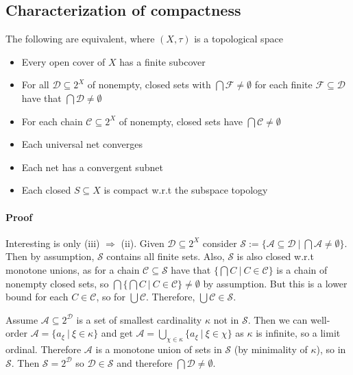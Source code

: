 \documentclass{scrartcl}
\begin{document}
\subsection{Characterization of compactness}
The following are equivalent, where $(X, \tau)$ is a topological space
\begin{itemize}
    \item Every open cover of $X$ has a finite subcover
    \item For all $\mathcal{D} \subseteq 2^X$ of nonempty, closed sets with $\bigcap \mathcal{F} \neq \emptyset$ for each finite $\mathcal{F} \subseteq \mathcal{D}$ have that $\bigcap \mathcal{D} \neq \emptyset$
    \item For each chain $\mathcal{C} \subseteq 2^X$ of nonempty, closed sets have $\bigcap \mathcal{C} \neq \emptyset$
    \item Each universal net converges
    \item Each net has a convergent subnet
    \item Each closed $S \subseteq X$ is compact w.r.t the subspace topology
\end{itemize}
\paragraph{Proof} Interesting is only (iii) $\Rightarrow$ (ii). Given $\mathcal{D} \subseteq 2^X$ consider $\mathcal{S} := \{\mathcal{A} \subseteq \mathcal{D} \ | \ \bigcap \mathcal{A} \neq \emptyset \}$. Then by assumption, $\mathcal{S}$ contains all finite sets.
Also, $\mathcal{S}$ is also closed w.r.t monotone unions, as for a chain $\mathcal{C} \subseteq \mathcal{S}$ have that $\{ \bigcap C \ | \ C \in \mathcal{C} \}$ is a chain of nonempty closed sets, so $\bigcap \{ \bigcap C \ | \ C \in \mathcal{C} \} \neq \emptyset$ by assumption. But this is a lower bound for each $C \in \mathcal{C}$, so for $\bigcup \mathcal{C}$. Therefore, $\bigcup \mathcal{C} \in \mathcal{S}$.

Assume $\mathcal{A} \subseteq 2^\mathcal{D}$ is a set of smallest cardinality $\kappa$ not in $\mathcal{S}$. Then we can well-order $\mathcal{A} = \{a_\xi \ | \ \xi \in \kappa\}$ and get $\mathcal{A} = \bigcup_{\chi \in \kappa} \{ a_\xi \ | \ \xi \in \chi\}$ as $\kappa$ is infinite, so a limit ordinal. Therefore $\mathcal{A}$ is a monotone union of sets in $\mathcal{S}$ (by minimality of $\kappa$), so in $\mathcal{S}$.
Then $\mathcal{S} = 2^\mathcal{D}$ so $\mathcal{D} \in \mathcal{S}$ and therefore $\bigcap \mathcal{D} \neq \emptyset$.
\end{document}
